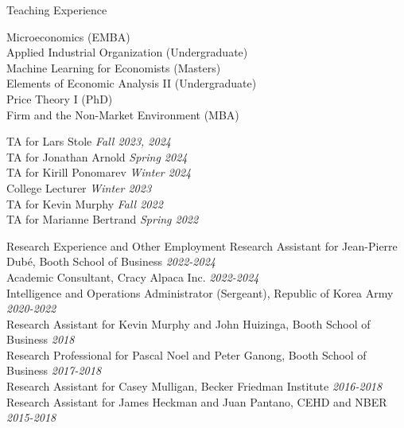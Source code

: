 \documentclass{resume} %
\begin{document}
	\begin{rSection}{Teaching Experience}
		\begin{minipage}[t]{0.54\textwidth}
			Microeconomics (EMBA) \\
			Applied Industrial Organization (Undergraduate) \\
			Machine Learning for Economists (Masters) \\
			Elements of Economic Analysis II (Undergraduate) \\
			Price Theory I (PhD) \\
			Firm and the Non-Market Environment (MBA)
		\end{minipage}
		\begin{minipage}[t]{0.42\textwidth}
			TA for Lars Stole \hfill {\em Fall 2023, 2024} \\
			TA for Jonathan Arnold \hfill {\em Spring 2024} \\
			TA for Kirill Ponomarev \hfill {\em Winter 2024} \\
			College Lecturer \hfill {\em Winter 2023} \\
			TA for Kevin Murphy \hfill {\em Fall 2022} \\
			TA for Marianne Bertrand \hfill {\em Spring 2022}
		\end{minipage}
	\end{rSection}

	\begin{rSection}{Research Experience and Other Employment}
		Research Assistant for Jean-Pierre Dub\'e, Booth School of Business \hfill {\em 2022-2024} \\
		Academic Consultant, Cracy Alpaca Inc. \hfill {\em 2022-2024} \\
		Intelligence and Operations Administrator (Sergeant), Republic of Korea Army \hfill {\em 2020-2022} \\
		Research Assistant for Kevin Murphy and John Huizinga, Booth School of Business \hfill {\em 2018} \\
		Research Professional for Pascal Noel and Peter Ganong, Booth School of Business \hfill {\em 2017-2018} \\
		Research Assistant for Casey Mulligan, Becker Friedman Institute \hfill {\em 2016-2018} \\
		Research Assistant for James Heckman and Juan Pantano, CEHD and NBER \hfill {\em 2015-2018}
	\end{rSection}
	
\end{document}
